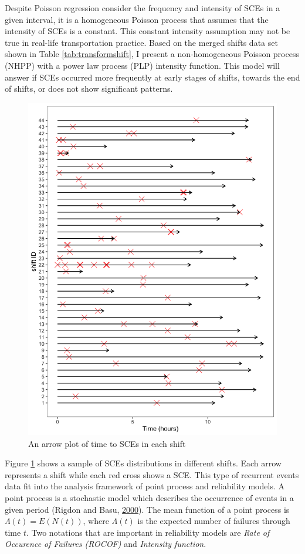 \documentclass[12pt]{book}
\numberwithin{equation}{chapter}
\begin{document}
Despite Poisson regression consider the frequency and intensity of SCEs in a given interval, it is a homogeneous Poisson process that assumes that the intensity of SCEs is a constant. This constant intensity assumption may not be true in real-life transportation practice. Based on the merged shifts data set shown in Table \ref{tab:transformshift}, I present a non-homogeneous Poisson process (NHPP) with a power law process (PLP) intensity function. This model will answer if SCEs occurred more frequently at early stages of shifts, towards the end of shifts, or does not show significant patterns.

\begin{figure}[!ht]

{\centering \includegraphics[width=0.8\linewidth]{figs/NHPP_arrow_plot} 

}

\caption{An arrow plot of time to SCEs in each shift}\label{fig:arrowplot}
\end{figure}

Figure \ref{fig:arrowplot} shows a sample of SCEs distributions in different shifts. Each arrow represents a shift while each red cross shows a SCE. This type of recurrent events data fit into the analysis framework of point process and reliability models. A point process is a stochastic model which describes the occurrence of events in a given period (Rigdon and Basu, \protect\hyperlink{ref-rigdon2000statistical}{2000}). The mean function of a point process is \(\Lambda(t) = E(N(t))\), where \(\Lambda(t)\) is the expected number of failures through time \(t\). Two notations that are important in reliability models are \emph{Rate of Occurence of Failures (ROCOF)} and \emph{Intensity function}.
\end{document}
